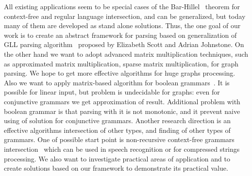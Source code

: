 \documentclass{vldb}
\begin{document}
All existing applications seem to be special cases of the Bar-Hillel~\cite{Bar-Hillel} theorem for context-free and regular language intersection, and can be generalized, but today many of them are developed as stand alone solutions.
Thus, the one goal of our work is to create an abstract framework for parsing based on generalization of GLL parsing algorithm~\cite{GLL} proposed by Elizabeth Scott and Adrian Johnstone. 
On the other hand we want to adopt advanced matrix multiplication techniques, such as approximated matrix multiplication, sparse matrix multiplication, for graph parsing.
We hope to get more effective algorithms for huge graphs processing.
Also we want to apply matrix-based algorithm for boolean grammars~\cite{Okhotin}. 
It is possible for linear input, but problem is undecidable for graphs: even for conjunctive grammars we get approximation of result. 
Additional problem with boolean grammar is that parsing with it is not monotonic, and it prevent 
naive using of solution for conjunctive grammars.
Another research direction is an effective algorithms intersection of other types, and finding of other types of grammars.
One of possible start point is non-recursive context-free grammars intersection~\cite{Nederhof1, Nederhof2} which can be used in speech recognition or for compressed strings processing. 
We also want to investigate practical areas of application and to create solutions based on our framework to demonstrate its practical value.
\end{document}
